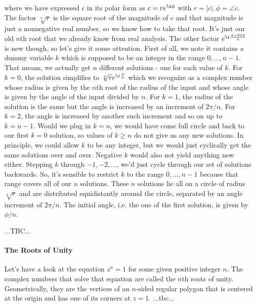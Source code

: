 where we have expressed $c$ in its polar form as $c = r e^{\i \phi}$ with $r = |c|, \phi = \angle c$. The factor $\sqrt[n]{r}$ is the square root of the magnitude of $c$ and that magnitude is just a nonnegative real number, so we know how to take that root. It's just our old $n$th root that we already know from real analysis. The other factor $e^{\i \frac{\phi + 2 \pi k}{n}}$ is new though, so let's give it some attention. First of all, we note it contains a dummy variable $k$ which is supposed to be an integer in the range $0,\ldots,n-1$. That means, we actually get $n$ different solutions - one for each value of $k$. For $k = 0$, the solution simplifies to $\sqrt[n]{r} e^{\i \frac{\phi}{n}}$ which we recognize as a complex number whose radius is given by the $n$th root of the radius of the input and whose angle is given by the angle of the input divided by $n$. For $k=1$, the radius of the solution is the same but the angle is increased by an increment of $2\pi / n$. For $k=2$, the angle is increased by another such increment and so on up to $k=n-1$. Would we plug in $k=n$, we would have come full circle and back to our first $k=0$ solution, so values of $k \geq n$ do not give us any new solutions. In principle, we could allow $k$ to be any integer, but we would just cyclically get the same solutions over and over. Negative $k$ would also not yield anything new either. Stepping $k$ through $-1,-2,\ldots$, we'd just cycle through our set of solutions backwards. So, it's sensible to restrict $k$ to the range $0,\ldots,n-1$ because that range covers all of our $n$ solutions. These $n$ solutions lie all on a circle of radius $\sqrt[n]{r}$ and are distributed equidistantly around the circle, separated by an angle increment of $2 \pi / n$. The initial angle, i.e. the one of the first solution, is given by $\phi / n$.

\medskip


%
...TBC...

\paragraph{The Roots of Unity}
Let's have a look at the equation $z^n = 1$ for some given positive integer $n$. The complex numbers that solve that equation are called the $n$th roots of unity. Geometrically, they are the vertices of an $n$-sided regular polygon that is centered at the origin and has one of its corners at $z = 1$. ...tbc...






